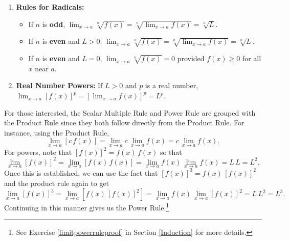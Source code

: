 \documentclass{ximera}
\begin{document}
\begin{theorem}
\begin{enumerate}
\begin{enumerate}
\item \textbf{Rules for Radicals:}  

\begin{itemize}

\item If $n$ is \textbf{odd}, $\lim_{x \rightarrow a} \sqrt[n]{f(x)} = \sqrt[n]{\lim_{x \rightarrow a} f(x)} = \sqrt[n]{L} $. 

\item  If $n$ is \textbf{even} and $L>0$, $\lim_{x \rightarrow a} \sqrt[n]{f(x)} = \sqrt[n]{\lim_{x \rightarrow a} f(x)} = \sqrt[n]{L} $. 

\item  If $n$ is \textbf{even} and $L=0$, $\lim_{x \rightarrow a} \sqrt[n]{f(x)} = 0$ provided $f(x) \geq 0$ for all $x$ near $a$.
 
 \end{itemize}
 
 \item \textbf{Real Number Powers:}  If $L>0$ and $p$ is a real number, $\lim_{x \rightarrow a} [f(x)]^{p} = \left[\lim_{x \rightarrow a} f(x)\right]^{p} = L^{p} $.
 

\end{enumerate}


\end{enumerate}

\end{theorem}



For those interested, the Scalar Multiple Rule and Power Rule are grouped with the Product Rule since they both follow directly from the Product Rule.  For instance, using the Product Rule,  \[ \lim_{x \rightarrow a} \left[c \, f(x)\right] = \lim_{x \rightarrow a} c \, \lim_{x \rightarrow a}  f(x) = c \, \lim_{x \rightarrow a}  f(x).\]  For powers, note that $\left[f(x)\right]^2 = f(x)  \, f(x) $ so that \[ \lim_{x \rightarrow a} \left[ f(x)\right]^2 = \lim_{x \rightarrow a} \left[ f(x) \, f(x) \right] =  \lim_{x \rightarrow a} f(x)  \, \lim_{x \rightarrow a}  f(x) = L \, L = L^2.\]  Once this is established, we can use the fact that $\left[f(x)\right]^3 = f(x)  \, \left[f(x)\right]^2 $ and the product rule again to get \[ \lim_{x \rightarrow a} \left[ f(x)\right]^3 = \lim_{x \rightarrow a} \left[ f(x) \, \left[f(x)\right]^2 \right] =  \lim_{x \rightarrow a} f(x)  \, \lim_{x \rightarrow a}  \left[f(x)\right]^2= L \, L^2 = L^3.\] Continuing in this manner gives us the Power Rule.\footnote{See Exercise \ref{limitpowerruleproof} in Section \ref{Induction} for more details.}
\end{document}
